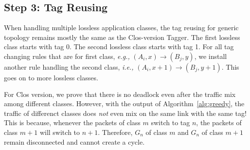 \subsection{Step 3: Tag Reusing}

When handling multiple lossless application classes, the tag reusing for generic topology 
remains mostly the same as the Clos-version Tagger.
The first lossless class starts with tag 0. The second lossless class starts with 
tag 1. For all tag changing rules that are for first class, {\em e.g.,} 
$(A_i, x)\rightarrow(B_j, y)$, we install another rule handling the second class,
{\em i.e.,} $(A_i, x+1)\rightarrow(B_j, y+1)$. This goes on to more lossless classes.

For Clos version, we prove that there is no deadlock even after the traffic mix among
different classes. However, with the output of Algorithm~\ref{alg:greedy}, the traffic
of differenct classes does {\em not} even mix on the same link with the same tag!
This is because, whenever the packets of class $m$ switch to tag $n$,  the packets of
class $m+1$ will switch to $n+1$. Therefore, $G_n$ of class $m$ and $G_n$ of class $m+1$
remain disconnected and cannot create a cycle.

